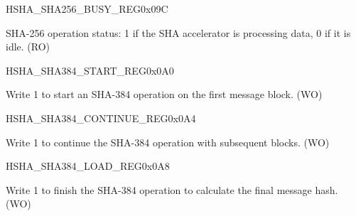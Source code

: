 \begin{register}{H}{SHA\_SHA256\_BUSY\_REG}{0x09C}\label{regdesc:SHASHA256BUSYREG}
%
%
\regnewline%
\begin{regdesc}\begin{reglist}
\item [SHA\_SHA256\_BUSY]SHA-256 operation status: 1 if the SHA accelerator is processing data, 0 if it is idle. (RO)
\end{reglist}\end{regdesc}
\end{register}


\begin{register}{H}{SHA\_SHA384\_START\_REG}{0x0A0}\label{regdesc:SHASHA384STARTREG}
%
%
\regnewline%
\begin{regdesc}\begin{reglist}
\item [SHA\_SHA384\_START]Write 1 to start an SHA-384 operation on the first message block. (WO)
\end{reglist}\end{regdesc}
\end{register}


\begin{register}{H}{SHA\_SHA384\_CONTINUE\_REG}{0x0A4}\label{regdesc:SHASHA384CONTINUEREG}
%
%
\regnewline%
\begin{regdesc}\begin{reglist}
\item [SHA\_SHA384\_CONTINUE]Write 1 to continue the SHA-384 operation with subsequent blocks. (WO)
\end{reglist}\end{regdesc}
\end{register}


\begin{register}{H}{SHA\_SHA384\_LOAD\_REG}{0x0A8}\label{regdesc:SHASHA384LOADREG}
%
%
\regnewline%
\begin{regdesc}\begin{reglist}
\item [SHA\_SHA384\_LOAD]Write 1 to finish the SHA-384 operation to calculate the final message hash. (WO)
\end{reglist}\end{regdesc}
\end{register}


